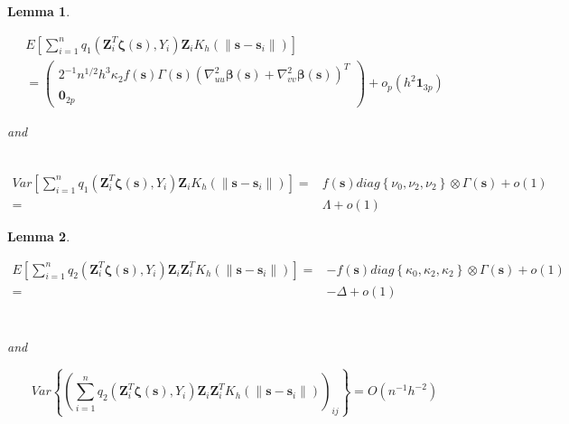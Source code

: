 \documentclass[authoryear,review, 12pt]{elsarticle}
\newtheorem{lem}{Lemma}
\begin{document}
\begin{lem}
\label{lemma:omega}

\begin{multline*}
E\left[\sum_{i=1}^{n}q_{1}\left(\bm{Z}_{i}^{T}\bm{\zeta}\left(\bm{s}\right),Y_{i}\right)\bm{Z}_{i}K_{h}\left(\|\bm{s}-\bm{s}_{i}\|\right)\right]\\
=\left(\begin{array}{c}
2^{-1}n^{1/2}h^{3}\kappa_{2}f\left(\bm{s}\right)\Gamma\left(\bm{s}\right)\left(\nabla_{uu}^{2}\bm{\beta}\left(\bm{s}\right)+\nabla_{vv}^{2}\bm{\beta}\left(\bm{s}\right)\right)^{T}\\
\bm{0}_{2p}
\end{array}\right)+o_{p}\left(h^{2}\bm{1}_{3p}\right)
\end{multline*}


and 

\begin{align*}
\end{align*}


\begin{align*}
Var\left[\sum_{i=1}^{n}q_{1}\left(\bm{Z}_{i}^{T}\bm{\zeta}\left(\bm{s}\right),Y_{i}\right)\bm{Z}_{i}K_{h}\left(\|\bm{s}-\bm{s}_{i}\|\right)\right]= & f\left(\bm{s}\right)diag\left\{ \nu_{0},\nu_{2},\nu_{2}\right\} \otimes\Gamma\left(\bm{s}\right)+o\left(1\right)\\
= & \Lambda+o\left(1\right)
\end{align*}

\end{lem}

\begin{lem}
\label{lemma:delta}

\begin{align*}
E\left[\sum_{i=1}^{n}q_{2}\left(\bm{Z}_{i}^{T}\bm{\zeta}\left(\bm{s}\right),Y_{i}\right)\bm{Z}_{i}\bm{Z}_{i}^{T}K_{h}\left(\|\bm{s}-\bm{s}_{i}\|\right)\right]= & -f\left(\bm{s}\right)diag\left\{ \kappa_{0},\kappa_{2},\kappa_{2}\right\} \otimes\Gamma\left(\bm{s}\right)+o\left(1\right)\\
= & -\Delta+o\left(1\right)
\end{align*}


\begin{multline*}
\\
\end{multline*}


and

\[
Var\left\{ \left(\sum_{i=1}^{n}q_{2}\left(\bm{Z}_{i}^{T}\bm{\zeta}\left(\bm{s}\right),Y_{i}\right)\bm{Z}_{i}\bm{Z}_{i}^{T}K_{h}\left(\|\bm{s}-\bm{s}_{i}\|\right)\right)_{ij}\right\} =O\left(n^{-1}h^{-2}\right)
\]

\end{lem}
\end{document}
